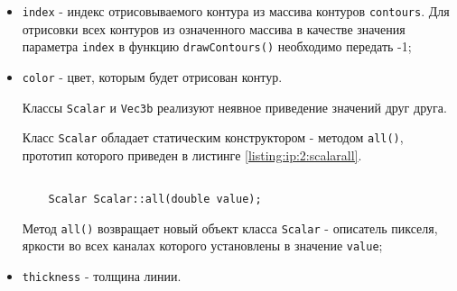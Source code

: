 \begin{itemize}

	\item \verb|index| - индекс отрисовываемого контура из массива контуров \verb|contours|. Для отрисовки всех контуров из означенного массива в качестве значения параметра \verb|index| в функцию \verb|drawContours()| необходимо передать -1;
	\item \verb|color| - цвет, которым будет отрисован контур.

	Классы \verb|Scalar| и \verb|Vec3b| реализуют неявное приведение значений друг друга.

	Класс \verb|Scalar| обладает статическим конструктором - методом \verb|all()|, прототип которого приведен в листинге \ref{listing:ip:2:scalarall}.

	\begin{lstlisting}

	Scalar Scalar::all(double value);

	\end{lstlisting}
	\mylistingend

	Метод \verb|all()| возвращает новый объект класса \verb|Scalar| - описатель пикселя, яркости во всех каналах которого установлены в значение \verb|value|;

	\item \verb|thickness| - толщина линии.

\end{itemize}


